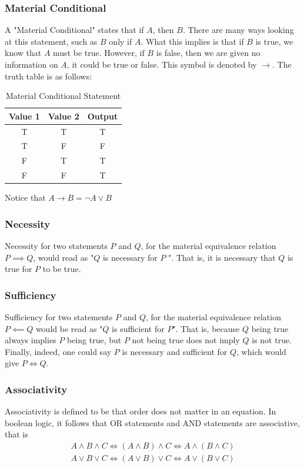 \documentclass[a4paper]{article}
\theoremstyle{plain}
\theoremstyle{definition}
\theoremstyle{remark}
\begin{document}
\subsubsection{Material Conditional \label{mat}}
A "Material Conditional" states that if $A$, then $ B$. There are many ways looking at this statement, such as $B$ only if $A$. What this implies is that if $B$ is true, we know that $A$ must be true. However, if $B$ is false, then we are given no information on $A$, it could be true or false. This symbol is denoted by $\to $. The truth table is as follows:
\begin{table}[H]
	\centering
	\caption{Material Conditional Statement}
	\label{tab:Material Conditional}
	\begin{tabular}{ccc}
		\hline
		Value 1 & Value 2  & Output \\
		\hline
		T & T & T \\
		T & F & F \\
		F & T & T \\
		F & F & T \\
		\hline
	\end{tabular}
\end{table}
Notice that $A \to B = \neg A \lor B$
\subsubsection{Necessity}
Necessity for two statements $P$ and $Q$, for the material equivalence relation $P \implies Q$, would read as "$Q$ is necessary for $P$ ". That is, it is necessary that $Q$ is true for $P$ to be true.
\subsubsection{Sufficiency}
Sufficiency for two statements $P$ and $Q$, for the material equivalence relation $P \impliedby Q$ would be read as "$Q$ is sufficient for $P$". That is, because $Q$ being true always implies $P$ being true, but $P$ not being true does not imply $Q$ is not true. Finally, indeed, one could say $P$ is necessary and sufficient for $Q$, which would give $P \iff Q$.
\subsubsection{Associativity}
Associativity is defined to be that order does not matter in an equation. In boolean logic, it follows that OR statements and AND statements are associative, that is
\begin{align*}
	A \land B \land C \iff (A \land B) \land C \iff A \land (B \land C)\\
	A \lor B \lor C \iff \left( A \lor B \right) \lor C \iff A \lor \left( B \lor C \right) 
\end{align*}
\end{document}
